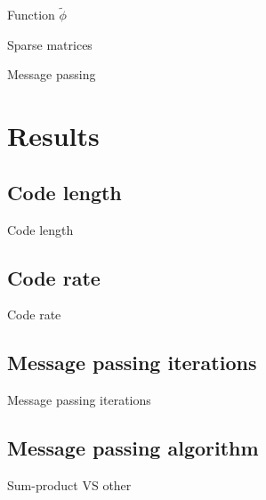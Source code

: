\documentclass{beamer}
\begin{document}
\begin{darkframes}
    \begin{frame}{Function $\tilde{\phi}$}
    \end{frame}

    \begin{frame}{Sparse matrices}
    \end{frame}

    \begin{frame}{Message passing}
    \end{frame}

    \section{Results}
    \subsection{Code length}
    \begin{frame}{Code length}
    \end{frame}

    \subsection{Code rate}
    \begin{frame}{Code rate}
    \end{frame}

    \subsection{Message passing iterations}
    \begin{frame}{Message passing iterations}
    \end{frame}

    \subsection{Message passing algorithm}
    \begin{frame}{Sum-product VS other}
    \end{frame}

  \end{darkframes}
\end{document}
